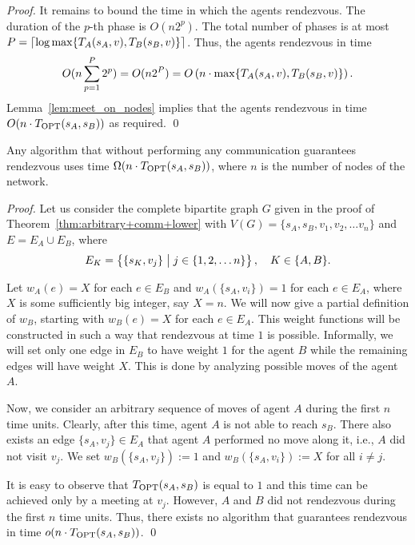 \documentclass{llncs}
\newcommand{\Topt}[2]{T_{{\scriptsize \textup{OPT}}}(#1,#2)}
\newcommand{\dist}[4][]{\if!#1!T_{#2}(#3,#4)\else T_{#2}(#3,#4,#1)\fi}
\newcommand{\startpos}[1]{s_{#1}}
\newcommand{\starta}{\startpos{A}}
\newcommand{\startb}{\startpos{B}}
\newcommand{\agentVariable}{K}
\newcommand{\st}{\hspace{0.1cm}\bigl|\bigr.\hspace{0.1cm}}
\begin{document}
\begin{proof}
It remains to bound the time in which the agents rendezvous.
The duration of the $p$-th phase is $O(n2^p)$.
The total number of phases is at most $P=\lceil \log \max\{\dist{A}{\starta}{v},\dist{B}{\startb}{v}\} \rceil$.
Thus, the agents rendezvous in time
\[
O(n\sum_{p=1}^P2^p)=O(n2^P)=O\left(n\cdot \max\{\dist{A}{\starta}{v},\dist{B}{\startb}{v}\} \right).
\]
Lemma~\ref{lem:meet_on_nodes} implies that the agents rendezvous in time $O(n\cdot\Topt{\starta}{\startb})$ as required.
\qed
\end{proof}

\begin{theorem} \label{thm:case1+no-comm}
Any  algorithm that without performing any communication guarantees rendezvous uses time $\Omega(n\cdot\Topt{\starta}{\startb})$, where $n$ is the number of nodes of the network.
\end{theorem}

\begin{proof}
Let us consider the complete bipartite graph $G$ given in the proof of Theorem~\ref{thm:arbitrary+comm+lower}
with $V(G) = \{\starta, \startb, v_1, v_2, \ldots v_n\}$
and $E=E_A\cup E_B$, where
\[E_{\agentVariable} = \left\{ \{\startpos{{\agentVariable}}, v_j\} \st j \in \{1, 2, \ldots n \} \right\},\quad {\agentVariable}\in\{A,B\}.\]

Let $w_A(e)=X$ for each $e\in E_B$ and $w_A(\{\starta, v_i\}) = 1$ for each $e\in E_A$, where $X$ is some sufficiently big integer, say $X=n$.
We will now give a partial definition of $w_B$, starting with $w_B(e)=X$ for each $e\in E_A$.
This weight functions will be constructed in such a way that rendezvous at time $1$ is possible.
Informally, we will set only one edge in $E_B$ to have weight $1$ for the agent $B$ while the remaining edges will have weight $X$.
This is done by analyzing possible moves of the agent $A$.

Now, we consider an arbitrary sequence of moves of agent $A$ during the first $n$ time units.
Clearly, after this time, agent $A$ is not able to reach $s_B$.
There also exists an edge $\{\starta,v_j\}\in E_A$ that agent $A$ performed no move along it, i.e., $A$ did not visit $v_j$.
We set $w_B(\{\starta, v_j\}) := 1$ and $w_B(\{\starta, v_i\}) := X$ for all $i \neq j$.

It is easy to observe that $\Topt{\starta}{\startb}$ is equal to $1$ and this time can be achieved only by a meeting at $v_j$.
However, $A$ and $B$ did not rendezvous during the first $n$ time units.
Thus, there exists no algorithm that guarantees rendezvous in time $o(n \cdot \Topt{\starta}{\startb})$.
\qed\end{proof}
\end{document}
